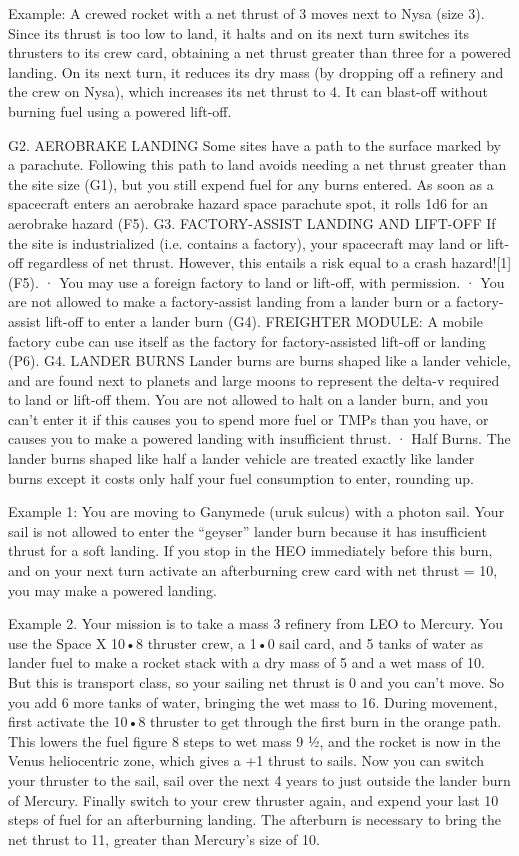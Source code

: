 \documentclass[a4paper]{book}
\begin{document}
Example: A crewed rocket with a net thrust of 3 moves next to Nysa (size 3). Since its thrust is too low to land, it halts and on its next turn switches its thrusters to its crew card, obtaining a net thrust greater than three for a powered landing. On its next turn, it reduces its dry mass (by dropping off a refinery and the crew on Nysa), which increases its net thrust to 4. It can blast-off without burning fuel using a powered lift-off.
 
G2. AEROBRAKE LANDING
Some sites have a path to the surface marked by a parachute. Following this path to land avoids needing a net thrust greater than the site size (G1), but you still expend fuel for any burns entered. As soon as a spacecraft enters an aerobrake hazard space parachute spot, it rolls 1d6 for an aerobrake hazard (F5).
G3. FACTORY-ASSIST LANDING AND LIFT-OFF
If the site is industrialized (i.e. contains a factory), your spacecraft may land or lift-off regardless of net thrust. However, this entails a risk equal to a crash hazard![1] (F5).
·       You may use a foreign factory to land or lift-off, with permission.
·       You are not allowed to make a factory-assist landing from a lander burn or a factory-assist lift-off to enter a lander burn (G4). 
FREIGHTER MODULE: A mobile factory cube can use itself as the factory for factory-assisted lift-off or landing (P6).
G4. LANDER BURNS
Lander burns are burns shaped like a lander vehicle, and are found next to planets and large moons to represent the delta-v required to land or lift-off them. You are not allowed to halt on a lander burn, and you can’t enter it if this causes you to spend more fuel or TMPs than you have, or causes you to make a powered landing with insufficient thrust.
·   Half Burns. The lander burns shaped like half a lander vehicle are treated exactly like lander burns except it costs only half your fuel consumption to enter, rounding up.

Example 1: You are moving to Ganymede (uruk sulcus) with a photon sail. Your sail is not allowed to enter the “geyser” lander burn because it has insufficient thrust for a soft landing. If you stop in the HEO immediately before this burn, and on your next turn activate an afterburning crew card with net thrust = 10, you may make a powered landing.

Example 2. Your mission is to take a mass 3 refinery from LEO to Mercury. You use the Space X 10•8 thruster crew, a 1•0 sail card, and 5 tanks of water as lander fuel to make a rocket stack with a dry mass of 5 and a wet mass of 10. But this is transport class, so your sailing net thrust is 0 and you can't move. So you add 6 more tanks of water, bringing the wet mass to 16.  During movement, first activate the 10•8 thruster to get through the first burn in the orange path. This lowers the fuel figure 8 steps to wet mass 9 ½, and the rocket is now in the Venus heliocentric zone, which gives a +1 thrust to sails. Now you can switch your thruster to the sail, sail over the next 4 years to just outside the lander burn of Mercury. Finally switch to your crew thruster again, and expend your last 10 steps of fuel for an afterburning landing.  The afterburn is necessary to bring the net thrust to 11, greater than Mercury’s size of 10.
 
\end{document}
